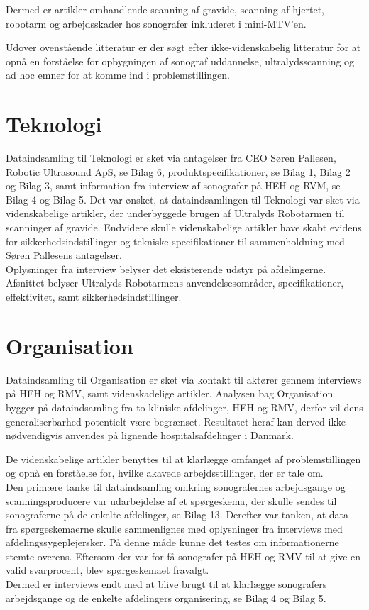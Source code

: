 Dermed er artikler omhandlende scanning af gravide, scanning af hjertet, robotarm og arbejdsskader hos sonografer inkluderet i mini-MTV'en.

Udover ovenstående litteratur er der søgt efter ikke-videnskabelig litteratur for at opnå en forståelse for opbygningen af sonograf uddannelse, ultralydsscanning og ad hoc emner for at komme ind i problemstillingen. 

\section{Teknologi}
Dataindsamling til Teknologi er sket via antagelser fra CEO Søren Pallesen, Robotic Ultrasound ApS, se Bilag 6, produktspecifikationer, se Bilag 1, Bilag 2 og Bilag 3, samt information fra interview af sonografer på HEH og RVM, se Bilag 4 og Bilag 5. Det var ønsket, at dataindsamlingen til Teknologi var sket via videnskabelige artikler, der underbyggede brugen af Ultralyds Robotarmen til scanninger af gravide.
Endvidere skulle videnskabelige artikler have skabt evidens for sikkerhedsindstillinger og tekniske specifikationer til sammenholdning med Søren Pallesens antagelser.\\
Oplysninger fra interview belyser det eksisterende udstyr på afdelingerne. Afsnittet belyser Ultralyds Robotarmens anvendelsesområder, specifikationer, effektivitet, samt sikkerhedsindstillinger.

\section{Organisation}
Dataindsamling til Organisation er sket via kontakt til aktører gennem interviews på HEH og RMV, samt videnskadelige artikler. Analysen bag Organisation bygger på dataindsamling fra to kliniske afdelinger, HEH og RMV, derfor vil dens generaliserbarhed potentielt være begrænset. Resultatet heraf kan derved ikke nødvendigvis anvendes på lignende hospitalsafdelinger i Danmark. 

De videnskabelige artikler benyttes til at klarlægge omfanget af problemstillingen og opnå en forståelse for, hvilke akavede arbejdsstillinger, der er tale om. \\
Den primære tanke til dataindsamling omkring sonografernes arbejdsgange og scanningsproducere var udarbejdelse af et spørgeskema, der skulle sendes til sonograferne på de enkelte afdelinger, se Bilag 13. Derefter var tanken, at data fra spørgeskemaerne skulle sammenlignes med oplysninger fra interviews med afdelingssygeplejersker. På denne måde kunne det testes om informationerne stemte overens. Eftersom der var for få sonografer på HEH og RMV til at give en valid svarprocent, blev spørgeskemaet fravalgt. \\
Dermed er interviews endt med at blive brugt til at klarlægge sonografers arbejdsgange og de enkelte afdelingers organisering, se Bilag 4 og Bilag 5. 

